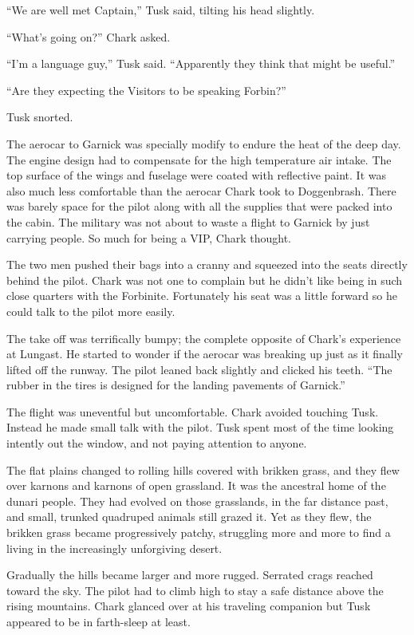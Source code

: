 ``We are well met Captain,'' Tusk said, tilting his head slightly.

``What's going on?'' Chark asked.

``I'm a language guy,'' Tusk said. ``Apparently they think that might be useful.''

``Are they expecting the Visitors to be speaking Forbin?''

Tusk snorted.

The aerocar to Garnick was specially modify to endure the heat of the deep day. The engine
design had to compensate for the high temperature air intake. The top surface of the wings and
fuselage were coated with reflective paint. It was also much less comfortable than the aerocar
Chark took to Doggenbrash. There was barely space for the pilot along with all the supplies that
were packed into the cabin. The military was not about to waste a flight to Garnick by just
carrying people. So much for being a VIP, Chark thought.

The two men pushed their bags into a cranny and squeezed into the seats directly behind the
pilot. Chark was not one to complain but he didn't like being in such close quarters with the
Forbinite. Fortunately his seat was a little forward so he could talk to the pilot more easily.

The take off was terrifically bumpy; the complete opposite of Chark's experience at Lungast. He
started to wonder if the aerocar was breaking up just as it finally lifted off the runway. The
pilot leaned back slightly and clicked his teeth. ``The rubber in the tires is designed for the
landing pavements of Garnick.''

The flight was uneventful but uncomfortable. Chark avoided touching Tusk. Instead he made small
talk with the pilot. Tusk spent most of the time looking intently out the window, and not paying
attention to anyone.

The flat plains changed to rolling hills covered with brikken grass, and they flew over karnons
and karnons of open grassland. It was the ancestral home of the dunari people. They had evolved
on those grasslands, in the far distance past, and small, trunked quadruped animals still grazed
it. Yet as they flew, the brikken grass became progressively patchy, struggling more and more to
find a living in the increasingly unforgiving desert.

Gradually the hills became larger and more rugged. Serrated crags reached toward the sky. The
pilot had to climb high to stay a safe distance above the rising mountains. Chark glanced over
at his traveling companion but Tusk appeared to be in farth-sleep at least.

